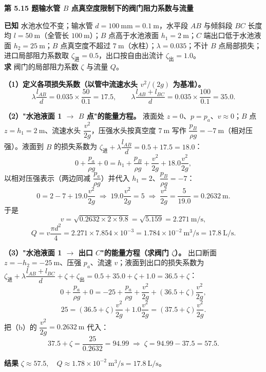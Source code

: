 \noindent\textbf{第 5.15 题\quad 输水管 $B$ 点真空度限制下的阀门阻力系数与流量}

\begin{jie}
\textbf{已知} 水池水位不变；输水管 $d=100\ \mathrm{mm}=0.1\ \mathrm{m}$，水平段 $AB$ 与倾斜段 $BC$ 长度均 $l=50\ \mathrm{m}$（全管长 $100\ \mathrm{m}$）；$B$ 点高于水池液面 $h_1=2\ \mathrm{m}$；$C$ 端出口低于水池液面 $h_2=25\ \mathrm{m}$；$B$ 点真空度不超过 $7\ \mathrm{m}$（水柱）；$\lambda=0.035$；不计 $B$ 点局部损失；进口局部阻力系数取 $\zeta_{\text{进}}=0.5$，出口按自由出流计 $\zeta_{\text{出}}=1.0$。\\
\textbf{求} 阀门的局部阻力系数 $\zeta$ 与流量 $Q$。

\textbf{（1）定义各项损失系数（以管中流速水头 $v^2/(2g)$ 为基准）。}
\[\lambda\frac{l_{AB}}{d}=0.035\times\frac{50}{0.1}=17.5,\qquad
\lambda\frac{l_{AB}+l_{BC}}{d}=0.035\times\frac{100}{0.1}=35.0.\]

\textbf{（2）"水池液面 1 $\to$ $B$ 点"的能量方程。} 液面处 $z=0$、$p=p_a$、$v\approx0$；$B$ 点 $z=h_1=2\ \mathrm{m}$、流速水头 $\dfrac{v^2}{2g}$，压强水头按真空度 $7\ \mathrm{m}$ 写作 $\dfrac{p_B}{\rho g}=-7\ \mathrm{m}$（相对压强）。液面到 $B$ 的损失系数为 $\zeta_{\text{进}}+\lambda\dfrac{l_{AB}}{d}=0.5+17.5=18.0$：
\[0+\frac{p_a}{\rho g}+0=h_1+\frac{p_B}{\rho g}+\frac{v^2}{2g}+18.0\frac{v^2}{2g},\]
以相对压强表示（两边同减 $\dfrac{p_a}{\rho g}$）并代入 $h_1=2$、$\dfrac{p_B}{\rho g}=-7$：
\[0=2-7+19.0\frac{v^2}{2g}\;\Longrightarrow\;19.0\frac{v^2}{2g}=5
\;\Longrightarrow\;\frac{v^2}{2g}=\frac{5}{19.0}=0.2632\ \mathrm{m}.\tag{b}\]
于是
\[v=\sqrt{0.2632\times2\times9.8}=\sqrt{5.159}=2.271\ \mathrm{m/s},\]
\[Q=v\frac{\pi d^2}{4}=2.271\times7.854\times10^{-3}=1.784\times10^{-2}\ \mathrm{m^3/s}=17.8\ \mathrm{L/s}.\]

\textbf{（3）"水池液面 1 $\to$ 出口 $C$"的能量方程（求阀门 $\zeta$）。} 出口断面 $z=-h_2=-25\ \mathrm{m}$、压强 $p_a$、流速 $v$；液面到出口的损失系数为 $\zeta_{\text{进}}+\lambda\dfrac{l_{AB}+l_{BC}}{d}+\zeta+\zeta_{\text{出}}=0.5+35.0+\zeta+1.0=36.5+\zeta$：
\[0+\frac{p_a}{\rho g}+0=-25+\frac{p_a}{\rho g}+\frac{v^2}{2g}+\left(36.5+\zeta\right)\frac{v^2}{2g},\]
\[25=\left(36.5+\zeta\right)\frac{v^2}{2g}+1.0\frac{v^2}{2g}=\left(37.5+\zeta\right)\frac{v^2}{2g}.\tag{a}\]
把（b）的 $\dfrac{v^2}{2g}=0.2632\ \mathrm{m}$ 代入：
\[37.5+\zeta=\frac{25}{0.2632}=94.99\;\Longrightarrow\;\zeta=94.99-37.5=57.5.\]

\textbf{结果} $\boxed{\zeta\approx57.5,\quad Q\approx1.78\times10^{-2}\ \mathrm{m^3/s}=17.8\ \mathrm{L/s}}$。


\end{jie}
